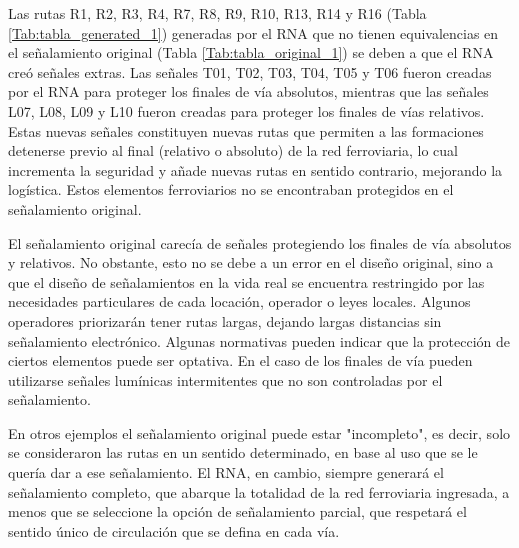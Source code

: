     Las rutas R1, R2, R3, R4, R7, R8, R9, R10, R13, R14 y R16 (Tabla \ref{Tab:tabla_generated_1}) generadas por el RNA que no tienen equivalencias en el señalamiento original (Tabla \ref{Tab:tabla_original_1}) se deben a que el RNA creó señales extras. Las señales T01, T02, T03, T04, T05 y T06 fueron creadas por el RNA para proteger los finales de vía absolutos, mientras que las señales L07, L08, L09 y L10 fueron creadas para proteger los finales de vías relativos. Estas nuevas señales constituyen nuevas rutas que permiten a las formaciones detenerse previo al final (relativo o absoluto) de la red ferroviaria, lo cual incrementa la seguridad y añade nuevas rutas en sentido contrario, mejorando la logística. Estos elementos ferroviarios no se encontraban protegidos en el señalamiento original.
    
    El señalamiento original carecía de señales protegiendo los finales de vía absolutos y relativos. No obstante, esto no se debe a un error en el diseño original, sino a que el diseño de señalamientos en la vida real se encuentra restringido por las necesidades particulares de cada locación, operador o leyes locales. Algunos operadores priorizarán tener rutas largas, dejando largas distancias sin señalamiento electrónico. Algunas normativas pueden indicar que la protección de ciertos elementos puede ser optativa. En el caso de los finales de vía pueden utilizarse señales lumínicas intermitentes que no son controladas por el señalamiento.
    
    En otros ejemplos el señalamiento original puede estar "incompleto", es decir, solo se consideraron las rutas en un sentido determinado, en base al uso que se le quería dar a ese señalamiento. El RNA, en cambio, siempre generará el señalamiento completo, que abarque la totalidad de la red ferroviaria ingresada, a menos que se seleccione la opción de señalamiento parcial, que respetará el sentido único de circulación que se defina en cada vía.    
    
    
    
    
    
    